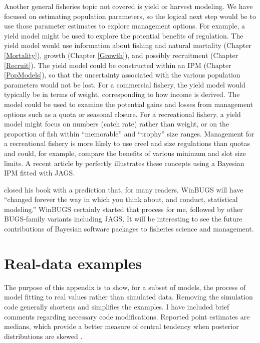 \documentclass[
]{krantz}
\begin{document}
Another general fisheries topic not covered is yield or harvest modeling. We have focused on estimating population parameters, so the logical next step would be to use those parameter estimates to explore management options. For example, a yield model might be used to explore the potential benefits of regulation. The yield model would use information about fishing and natural mortality (Chapter \ref{Mortality}), growth (Chapter \ref{Growth}), and possibly recruitment (Chapter \ref{Recruit}). The yield model could be constructed within an IPM (Chapter \ref{PopModels}), so that the uncertainty associated with the various population parameters would not be lost. For a commercial fishery, the yield model would typically be in terms of weight, corresponding to how income is derived. The model could be used to examine the potential gains and losses from management options such as a quota or seasonal closure. For a recreational fishery, a yield model might focus on numbers (catch rate) rather than weight, or on the proportion of fish within ``memorable'' and ``trophy'' size ranges. Management for a recreational fishery is more likely to use creel and size regulations than quotas and could, for example, compare the benefits of various minimum and slot size limits. A recent article by \citet{doll.etal_2021} perfectly illustrates these concepts using a Bayesian IPM fitted with JAGS.

\citet{kéry_2010} closed his book with a prediction that, for many readers, WinBUGS will have ``changed forever the way in which you think about, and conduct, statistical modeling.'' WinBUGS certainly started that process for me, followed by other BUGS-family variants including JAGS. It will be interesting to see the future contributions of Bayesian software packages to fisheries science and management.

\cleardoublepage

\hypertarget{appendix-appendix}{%
\appendix {}}


\hypertarget{real-data-examples}{%
\chapter{Real-data examples}\label{real-data-examples}}

The purpose of this appendix is to show, for a subset of models, the process of model fitting to real values rather than simulated data. Removing the simulation code generally shortens and simplifies the examples. I have included brief comments regarding necessary code modifications. Reported point estimates are medians, which provide a better measure of central tendency when posterior distributions are skewed \citep{kruschke_2021}.
\end{document}
